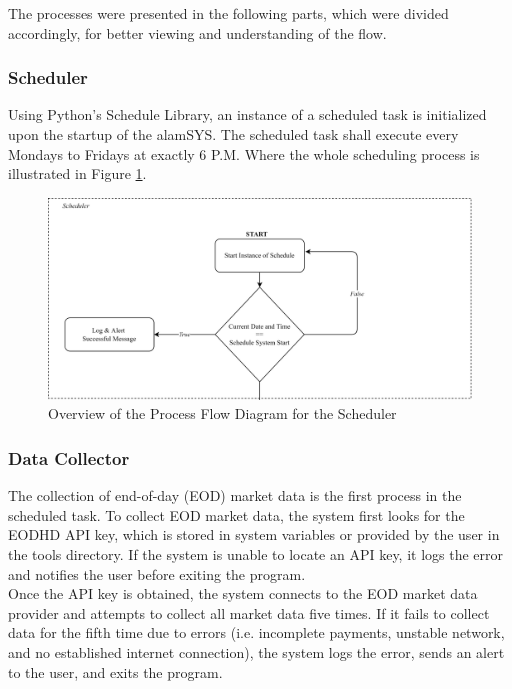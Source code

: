 \FloatBarrier

The processes were presented in the following parts, which were divided accordingly, for better 
viewing and understanding of the flow.

\subsubsection{Scheduler}
\label{subsubsc:scheduler}
Using Python's Schedule Library, an instance of a scheduled task
is initialized upon the startup of the alamSYS. The scheduled task
shall execute every Mondays to Fridays at exactly 6 P.M. Where
the whole scheduling process is illustrated in Figure \ref{fig:process_flowchart_scheduler}.
\hfill \\
\begin{figure}[ht]
    \centering
    \includegraphics[width=1\textwidth]{./assets/Chapter_3/PFC/ProcessFlowchart_Scheduler.png}
    \caption{Overview of the Process Flow Diagram for the Scheduler}
    \label{fig:process_flowchart_scheduler}
\end{figure}
\FloatBarrier

\subsubsection{Data Collector}
\label{subsubsec:data_collector}
The collection of end-of-day (EOD) market data is the first process in the scheduled task.
To collect EOD market data, the system first looks for the EODHD API key, 
which is stored in system variables or provided by the user in the tools directory. 
If the system is unable to locate an API key, it logs the error and notifies the user before 
exiting the program.
\hfill \\

Once the API key is obtained, the system connects to the EOD market data provider and 
attempts to collect all market data five times. If it fails to collect data 
for the fifth time due to errors (i.e. incomplete payments, unstable network, and no established internet connection), 
the system logs the error, sends an alert to the user, and exits the program.
\hfill \\

